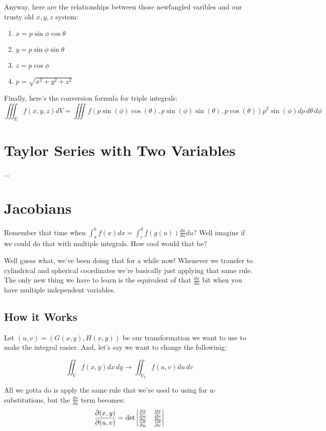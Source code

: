 \documentclass[a4paper,12pt]{report}
\begin{document}
Anyway, here are the relationships between those newfangled varibles and our trusty old $x, y, z$ system:
\begin{enumerate}
\item $x = p\sin\phi\cos\theta$
\item $y = p\sin\phi\sin\theta$
\item $z = p\cos\phi$
\item $p = \sqrt{x^2+y^2+z^2}$
\end{enumerate}

Finally, here's the conversion formula for triple integrals:
$$\iiint_E f(x, y, z) dV = \iiint f(p\sin(\phi)\cos(\theta), p\sin(\phi)\sin(\theta), p\cos(\theta)) p^2\sin(\phi) dp\,d\theta\,d\phi $$

\section{Taylor Series with Two Variables}
...

\section{Jacobians}
Remember that time when $\int_a^b f(x) dx = \int_c^d f(g(u))\frac{dx}{du} du$? Well imagine if we could do that with 
multiple integrals. How cool would that be?

Well guess what, we've been doing that for a while now! Whenever we transfer to cylindrical and spherical coordinates we're 
basically just applying that same rule. The only new thing we have to learn is the equivalent of that $\frac{dx}{du}$ bit when 
you have multiple independent variables. 

\subsection{How it Works}
Let $(u, v) = (G(x, y), H(x, y))$ be our transformation we want to use to make the integral easier. And, let's say we 
want to change the followinig: 

$$\iint_V f(x, y) dx\,dy \to \iint_{V_2} f(u, v) du\,dv$$

All we gotta do is apply the same rule that we're used to using for u-substitutions, but the $\frac{dx}{du}$ term becomes:
$$
\frac{\partial (x, y)}{\partial (u, v)} = \det 
\begin{vmatrix}
\frac{\partial x}{\partial u} & \frac{\partial x}{\partial v} \\ 
\frac{\partial y}{\partial u} & \frac{\partial y}{\partial v}  \notag
\end{vmatrix}
$$
\end{document}
